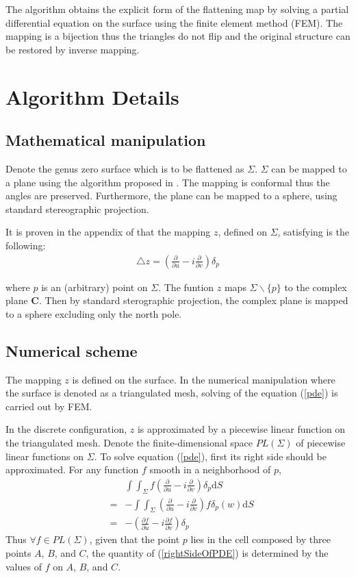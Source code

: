 \documentclass{InsightArticle}
\begin{document}
	The algorithm obtains the explicit form of the flattening map by
	solving a partial differential equation on the surface using the
	finite element method (FEM). The mapping is a bijection thus the
	triangles do not flip and the original structure can be restored by
	inverse mapping.

	\section{Algorithm Details}

	\subsection{Mathematical manipulation}
  Denote the genus zero surface which is to be flattened as $\Sigma$.
  $\Sigma$ can be mapped to a plane using the algorithm proposed in
  \cite{angenent1999lbo}. The mapping is conformal thus the angles are
  preserved. Furthermore, the plane can be mapped to a sphere, using
  standard stereographic projection.
  
  It is proven in the appendix of \cite{angenent1999lbo} that the mapping
  $z$, defined on $\Sigma$, satisfying is the following:
  \begin{eqnarray}
    \triangle z = (\frac{\partial}{\partial u} - i\frac{\partial}{\partial v})\delta_p 
    \label{pde}
  \end{eqnarray}
  
  where $p$ is an (arbitrary) point on $\Sigma$. The funtion $z$ maps
  $\Sigma \backslash \{p\}$ to the complex plane $\mathbf{C}$. Then by
  standard sterographic projection, the complex plane is mapped to a
  sphere excluding only the north pole.

  \subsection{Numerical scheme}
  The mapping $z$ is defined on the surface. In the numerical
  manipulation where the surface is denoted as a triangulated mesh,
  solving of the equation (\ref{pde}) is carried out by FEM.
  
  In the discrete configuration, $z$ is approximated by a piecewise
  linear function on the triangulated mesh. Denote the
  finite-dimensional space $PL(\Sigma)$ of piecewise linear functions
  on $\Sigma$. To solve equation (\ref{pde}), first its right side
  should be approximated. For any function $f$ smooth in a
  neighborhood of $p$,
  \begin{eqnarray}
    && \int\int_{\Sigma} f (\frac{\partial}{\partial u} - i\frac{\partial}{\partial v})\delta_p \mathrm{d}S \nonumber \\
    &=& - \int\int_{\Sigma}(\frac{\partial}{\partial u} - i\frac{\partial}{\partial v})f \delta_p(w) \mathrm{d}S \nonumber \\
    &=& -(\frac{\partial f}{\partial u} - i\frac{\partial f}{\partial v})\delta_p \label{rightSideOfPDE}
  \end{eqnarray}  
  Thus $\forall f \in PL(\Sigma)$, given that the point $p$ lies in
  the cell composed by three points $A$, $B$, and $C$, the quantity of
  (\ref{rightSideOfPDE}) is determined by the values of $f$ on $A$,
  $B$, and $C$.
  
\end{document}
